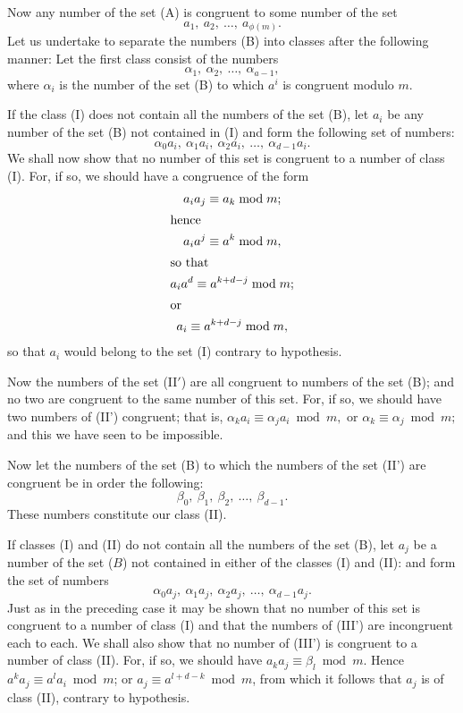 \documentclass[oneside]{book}
\begin{document}
\smallskip Now any number of the set (A) is congruent to some number
of the set
\begin{equation}
a_1,\ a_2,\ \ldots,\ a_{\phi(m)}. \tag{B}
\end{equation}
Let us undertake to separate the numbers (B) into classes after the
following manner: Let the first class consist of the numbers
\begin{equation}
\alpha_1,\ \alpha_2,\ \ldots,\ \alpha_{a-1}, \tag{I}
\end{equation}
where $\alpha_i$ is the number of the set (B) to which $a^i$ is
congruent modulo $m$.

If the class (I) does not contain all the numbers of the set (B),
let $a_i$ be any number of the set (B) not contained in (I) and form
the following set of numbers:
\begin{equation}
\alpha_0 a_i,\ \alpha_1 a_i,\ \alpha_2 a_i,\ \ldots,\
  \alpha_{d-1}a_i. \tag{II'}
\end{equation}
We shall now show that no number of this set is congruent to a
number of class (I). For, if so, we should have a congruence of the
form
\begin{gather*}
a_i a_j \equiv a_k \bmod m; \\
\intertext{hence}
a_i a^j \equiv a^k \bmod m, \\
\intertext{so that}
a_i a^d \equiv a^{k+d-j} \bmod m; \\
\intertext{or}
a_i \equiv a^{k+d-j} \bmod m,
\end{gather*}
so that $a_i$ would belong to the set (I) contrary to hypothesis.

Now the numbers of the set (II$'$) are all congruent to numbers of
the set (B); and no two are congruent to the same number of this
set. For, if so, we should have two numbers of (II') congruent; that
is, $\alpha_k a_i \equiv \alpha_j a_i \bmod m,$ or $\alpha_k \equiv
\alpha_j \bmod m;$ and this we have seen to be impossible.

Now let the numbers of the set (B) to which the numbers of the set
(II') are congruent be in order the following:
\begin{equation}
\beta_0,\ \beta_1,\ \beta_2,\ \ldots,\ \beta_{d-1}. \tag{II}
\end{equation}
These numbers constitute our class (II).

If classes (I) and (II) do not contain all the numbers of the set
(B), let $a_j$ be a number of the set ($B$) not contained in either
of the classes (I) and (II): and form the set of numbers
\begin{equation}
\alpha_0 a_j,\ \alpha_1 a_j,\ \alpha_2 a_j,\ \ldots,\
   \alpha_{d-1} a_j. \tag{III'}
\end{equation}
Just as in the preceding case it may be shown that no number of this
set is congruent to a number of class (I) and that the numbers of
(III') are incongruent each to each. We shall also show that no
number of (III') is congruent to a number of class (II). For, if so,
we should have $a_k a_j \equiv \beta_l \bmod m$. Hence $a^k a_j
\equiv a^l a_i \bmod m$; or $a_j \equiv a^{l+d-k} \bmod m$, from
which it follows that $a_j$ is of class (II), contrary to
hypothesis.
\end{document}
